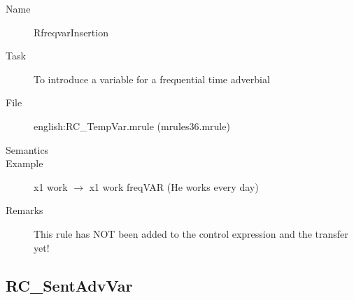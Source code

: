 \begin{description}
\vspace{1 cm}
\begin{description}
\item[Name] RfreqvarInsertion
\item[Task] To introduce a variable for a frequential time adverbial 
\item[File] english:RC\_TempVar.mrule (mrules36.mrule)
\item[Semantics] 
\item[Example] x1 work $\rightarrow$ x1 work freqVAR (He works every day)
\item[Remarks] This rule has NOT been added to the control expression and the 
transfer yet!
\end{description}

\end{description}

\newpage
\subsection{RC\_SentAdvVar}


